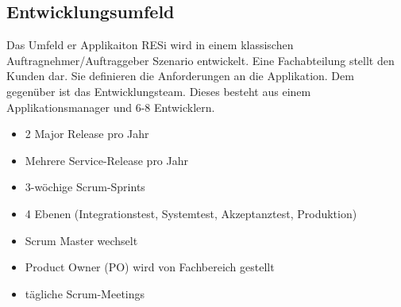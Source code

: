 \subsection{Entwicklungsumfeld}
Das Umfeld er Applikaiton RESi wird in einem klassischen Auftragnehmer/Auftraggeber Szenario entwickelt. Eine Fachabteilung stellt den Kunden dar. Sie definieren die Anforderungen an die Applikation. Dem gegenüber ist das Entwicklungsteam. Dieses besteht aus einem Applikationsmanager und 6-8 Entwicklern. 

\begin{itemize}
\item 2 Major Release pro Jahr
\item Mehrere Service-Release pro Jahr
\item 3-wöchige Scrum-Sprints
\item 4 Ebenen (Integrationstest, Systemtest, Akzeptanztest, Produktion)
\item Scrum Master wechselt
\item Product Owner (PO) wird von Fachbereich gestellt
\item tägliche Scrum-Meetings
\end{itemize} 

